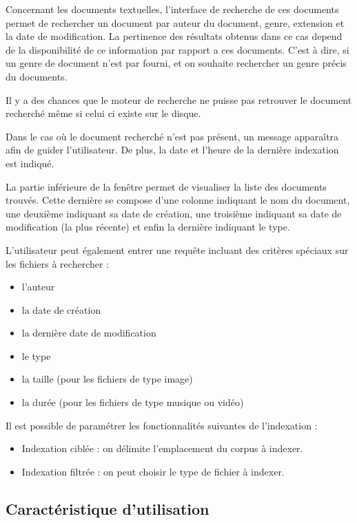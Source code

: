 Concernant les documents textuelles, l'interface de recherche de ces documents permet de rechercher un document par auteur du document, genre, extension et la date de modification. La pertinence des résultats obtenus dans ce cas depend de la disponibilité de ce information par rapport a ces documents. C'est à dire, si un genre de document n'est par fourni, et on souhaite rechercher un genre précis du documents.

Il y a des chances que le moteur de recherche ne puisse pas retrouver le document recherché même si celui ci existe sur le disque.

Dans le cas où le document recherché n'est pas présent, un message apparaîtra afin de guider l'utilisateur. 
De plus, la date et l'heure de la dernière indexation est indiqué.

La partie inférieure de la fenêtre permet de visualiser la liste des documents trouvés. 
Cette dernière se compose d'une colonne indiquant le nom du document, une deuxième indiquant sa date de création, une troisième indiquant sa date de modification (la plus récente) et enfin la dernière indiquant le type.



L'utilisateur peut également entrer une requête incluant des critères spéciaux
sur les fichiers à rechercher :
\begin{itemize}
 \item l'auteur
 \item la date de création
 \item la dernière date de modification
 \item le type
 \item la taille (pour les fichiers de type image)
 \item la durée (pour les fichiers de type musique ou vidéo)
\end{itemize}

Il est possible de paramétrer les fonctionnalités suivantes de l'indexation :
\begin{itemize}
 \item Indexation ciblée : on délimite l'emplacement du corpus à indexer.
 \item Indexation filtrée : on peut choisir le type de fichier à indexer.
\end{itemize}


\subsection{Caractéristique d'utilisation}


